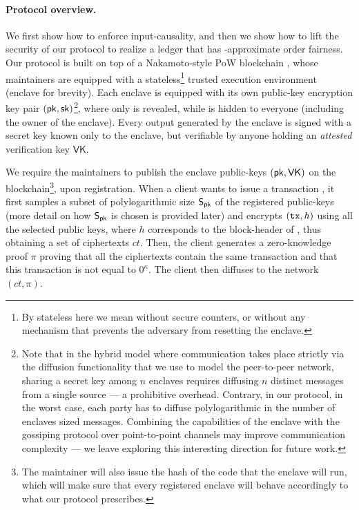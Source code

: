 \paragraph{Protocol overview.}
%
We first show how to enforce input-causality, and then we show how to lift the security of our protocol to realize a ledger that has \delay-approximate order fairness.
%
Our protocol is built on top of a Nakamoto-style PoW blockchain \chain, whose maintainers are equipped with a stateless\footnote{By stateless here we mean without secure counters, or without any mechanism that prevents the adversary from resetting the enclave.} trusted execution environment~\cite{EPRINT:CosDev16} (enclave for brevity).
%
Each enclave is equipped with its own public-key encryption key pair $(\mathsf{pk}, \mathsf{sk})$\footnote{Note that in the hybrid model where communication takes place strictly via the diffusion functionality \funcDiffuse that we use to model the peer-to-peer network, sharing a secret key \sk among $n$ enclaves requires diffusing $n$ distinct messages from a single source --- a prohibitive overhead. Contrary, in our protocol, in the worst case, each party has to diffuse polylogarithmic in the number of enclaves sized messages. Combining the capabilities of the enclave with the gossiping protocol over point-to-point channels may improve communication complexity --- we leave exploring this interesting direction for future work.}, where only \pk is revealed, while \sk is hidden to everyone (including the owner of the enclave).
%
Every output generated by the enclave is signed with a secret key known only to the enclave, but verifiable by anyone holding an \emph{attested} verification key $\mathsf{VK}$.

We require the maintainers to publish the enclave public-keys $(\mathsf{pk}, \mathsf{VK})$ on the blockchain\footnote{The maintainer will also issue the hash of the code that the enclave will run, which will make sure that every registered enclave will behave accordingly to what our protocol prescribes.}, upon registration.
%
When a client wants to issue a transaction \tx, it first samples a subset of polylogarithmic size $\mathsf{S}_\mathsf{pk}$ of the registered public-keys (more detail on how $\mathsf{S}_\mathsf{pk}$ is chosen is provided later) and encrypts $(\mathtt{tx}, h)$ using all the selected public keys, where $h$ corresponds to the block-header of \chain, thus obtaining a set of ciphertexts $ct$.
%
Then, the client generates a zero-knowledge proof $\pi$ proving that all the ciphertexts contain the same transaction and that this transaction is not equal to $0^\kappa$.
%
The client then diffuses to the network $(ct, \pi)$.


